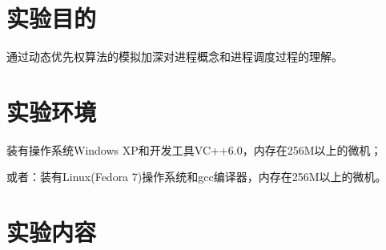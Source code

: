 \documentclass[c5size,a4paper,nofonts]{ctexart}
\begin{document}

\setcounter{part}{2}


\iffalse
\section{实验目的}
通过动态优先权算法的模拟加深对进程概念和进程调度过程的理解。

\section{实验环境}
装有操作系统Windows XP和开发工具VC++6.0，内存在256M以上的微机；

或者：装有Linux(Fedora 7)操作系统和gcc编译器，内存在256M以上的微机。

\section{实验内容}
\end{document}
